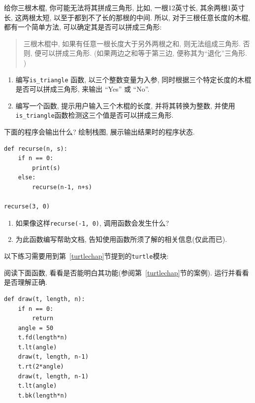 \documentclass[10pt]{book}
\begin{document}
\begin{exercise}

给你三根木棍, 你可能无法将其拼成三角形, 比如, 一根12英寸长, 
其余两根1英寸长, 这两根太短, 以至于都到不了长的那根的中间. 
所以, 对于三根任意长度的木棍, 都有一个简单方法, 可以确定其是否可以拼成三角形:

\begin{quotation}
三根木棍中, 如果有任意一根长度大于另外两根之和, 则无法组成三角形. 
否则, 便可以拼成三角形. (如果两边之和等于第三边, 便称其为``退化''三角形. )
\end{quotation}

\begin{enumerate}

\item 编写\verb"is_triangle" 函数, 以三个整数变量为入参, 
同时根据三个特定长度的木棍是否可以拼成三角形, 来输出 ``Yes'' 或 ``No''. 

\item 编写一个函数, 提示用户输入三个木棍的长度, 并将其转换为整数, 
并使用\verb"is_triangle"函数检测这三个值是否可以拼成三角形. 
\end{enumerate}

\end{exercise}

\begin{exercise}
下面的程序会输出什么? 绘制栈图, 展示输出结果时的程序状态.

\begin{verbatim}
def recurse(n, s):
    if n == 0:
        print(s)
    else:
        recurse(n-1, n+s)

recurse(3, 0)
\end{verbatim}

\begin{enumerate}

\item 如果像这样{\tt  recurse(-1, 0)}, 调用函数会发生什么?

\item 为此函数编写帮助文档, 告知使用函数所须了解的相关信息(仅此而已).

\end{enumerate}

\end{exercise}

以下练习需要用到第~\ref{turtlechap}节提到的{\tt turtle}模块:

\begin{exercise}
阅读下面函数, 看看是否能明白其功能(参阅第~\ref{turtlechap}节的案例). 
运行并看看是否理解正确. 

\begin{verbatim}
def draw(t, length, n):
    if n == 0:
        return
    angle = 50
    t.fd(length*n)
    t.lt(angle)
    draw(t, length, n-1)
    t.rt(2*angle)
    draw(t, length, n-1)
    t.lt(angle)
    t.bk(length*n)
\end{verbatim}

\end{exercise}
\end{document}
